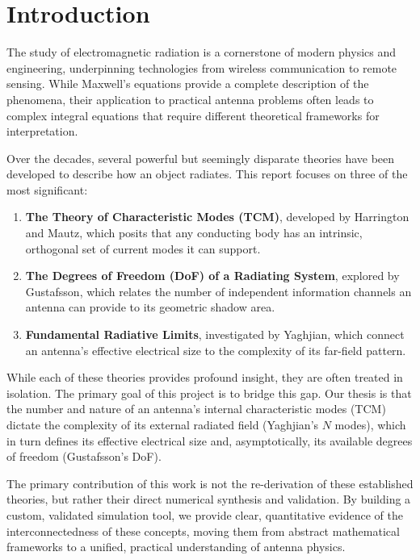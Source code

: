 \documentclass[11pt, a4paper]{report}
\begin{document}
\tableofcontents
\newpage

\chapter{Introduction}

The study of electromagnetic radiation is a cornerstone of modern physics and engineering, underpinning technologies from wireless communication to remote sensing. While Maxwell's equations provide a complete description of the phenomena, their application to practical antenna problems often leads to complex integral equations that require different theoretical frameworks for interpretation.

Over the decades, several powerful but seemingly disparate theories have been developed to describe how an object radiates. This report focuses on three of the most significant:
\begin{enumerate}
    \item \textbf{The Theory of Characteristic Modes (TCM)}, developed by Harrington and Mautz, which posits that any conducting body has an intrinsic, orthogonal set of current modes it can support.
    \item \textbf{The Degrees of Freedom (DoF) of a Radiating System}, explored by Gustafsson, which relates the number of independent information channels an antenna can provide to its geometric shadow area.
    \item \textbf{Fundamental Radiative Limits}, investigated by Yaghjian, which connect an antenna's effective electrical size to the complexity of its far-field pattern.
\end{enumerate}

While each of these theories provides profound insight, they are often treated in isolation. The primary goal of this project is to bridge this gap. Our thesis is that the number and nature of an antenna's internal characteristic modes (TCM) dictate the complexity of its external radiated field (Yaghjian's $N$ modes), which in turn defines its effective electrical size and, asymptotically, its available degrees of freedom (Gustafsson's DoF).

The primary contribution of this work is not the re-derivation of these established theories, but rather their direct numerical synthesis and validation. By building a custom, validated simulation tool, we provide clear, quantitative evidence of the interconnectedness of these concepts, moving them from abstract mathematical frameworks to a unified, practical understanding of antenna physics.
\end{document}
